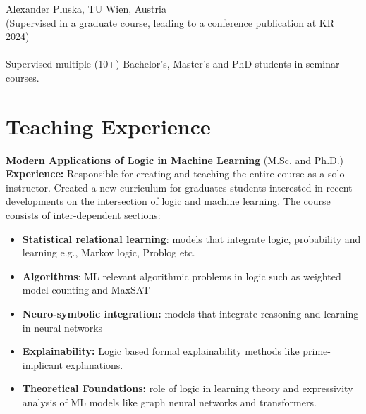 \documentclass[10pt, a4paper]{article}
\newcommand{\years}[1]{\marginnote{\scriptsize #1}}
\begin{document}
    \years{2024} Alexander Pluska,  TU Wien, Austria\\ 
    (Supervised in a graduate course, leading to a conference publication at KR 2024)\\ \\
\years{2023-Now} Supervised multiple (10+) Bachelor’s, Master’s and PhD students in seminar courses.


\section*{Teaching Experience}
\years{2025S}\textbf{Modern Applications of Logic in Machine Learning} (M.Sc. and Ph.D.)\\
\textbf{Experience:}  Responsible for creating and teaching the entire course as a solo instructor. Created a new curriculum for graduates students interested in recent developments on the intersection of logic and machine learning. The course consists of inter-dependent sections: 
\begin{itemize}
    \item \textbf{Statistical relational learning}: models that integrate logic, probability and learning e.g., Markov logic, Problog etc. 
    \item \textbf{Algorithms}: ML relevant algorithmic problems in logic such as weighted model counting and MaxSAT 
    \item \textbf{Neuro-symbolic integration:} models that integrate reasoning and learning in neural networks
    \item \textbf{Explainability:} Logic based formal explainability methods like prime-implicant explanations.
    \item \textbf{Theoretical Foundations:} role of logic in learning theory and expressivity analysis of ML models like graph neural networks and transformers. 
\end{itemize}
\end{document}
